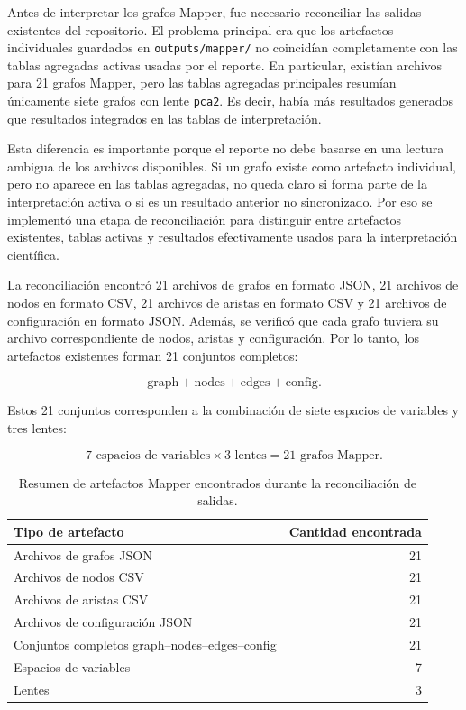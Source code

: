 Antes de interpretar los grafos Mapper, fue necesario reconciliar las salidas existentes del repositorio. El problema principal era que los artefactos individuales guardados en \texttt{outputs/mapper/} no coincidían completamente con las tablas agregadas activas usadas por el reporte. En particular, existían archivos para 21 grafos Mapper, pero las tablas agregadas principales resumían únicamente siete grafos con lente \texttt{pca2}. Es decir, había más resultados generados que resultados integrados en las tablas de interpretación.

Esta diferencia es importante porque el reporte no debe basarse en una lectura ambigua de los archivos disponibles. Si un grafo existe como artefacto individual, pero no aparece en las tablas agregadas, no queda claro si forma parte de la interpretación activa o si es un resultado anterior no sincronizado. Por eso se implementó una etapa de reconciliación para distinguir entre artefactos existentes, tablas activas y resultados efectivamente usados para la interpretación científica.

La reconciliación encontró 21 archivos de grafos en formato JSON, 21 archivos de nodos en formato CSV, 21 archivos de aristas en formato CSV y 21 archivos de configuración en formato JSON. Además, se verificó que cada grafo tuviera su archivo correspondiente de nodos, aristas y configuración. Por lo tanto, los artefactos existentes forman 21 conjuntos completos:

\[
\text{graph} + \text{nodes} + \text{edges} + \text{config}.
\]

Estos 21 conjuntos corresponden a la combinación de siete espacios de variables y tres lentes:

\[
7 \text{ espacios de variables} \times 3 \text{ lentes} = 21 \text{ grafos Mapper}.
\]

\begin{table}[H]
\centering
\small
\begin{tabular}{lr}
\toprule
\textbf{Tipo de artefacto} & \textbf{Cantidad encontrada} \\
\midrule
Archivos de grafos JSON & 21 \\
Archivos de nodos CSV & 21 \\
Archivos de aristas CSV & 21 \\
Archivos de configuración JSON & 21 \\
Conjuntos completos graph--nodes--edges--config & 21 \\
Espacios de variables & 7 \\
Lentes & 3 \\
\bottomrule
\end{tabular}
\caption{Resumen de artefactos Mapper encontrados durante la reconciliación de salidas.}
\label{tab:output_reconciliation_counts}
\end{table}

